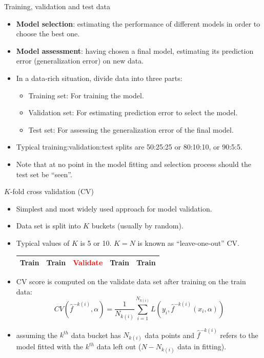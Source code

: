 \documentclass[aspectratio=169]{beamer}
\begin{document}
\begin{frame}{Training, validation and test data}
    \begin{itemize}
        \item \textbf{Model selection}: estimating the performance of different models in order to choose the best one.
        \item \textbf{Model assessment}: having chosen a final model, estimating its prediction error (generalization error) on new data.
        \item In a data-rich situation, divide data into three parts:
        \begin{itemize}
            \item Training set: For training the model.
            \item Validation set: For estimating prediction error to select the model.
            \item Test set: For assessing the generalization error of the final model.
        \end{itemize}
        \item Typical training:validation:test splits are 50:25:25 or 80:10:10, or 90:5:5.
        \item Note that at no point in the model fitting and selection process should the test set be ``seen''.
    \end{itemize}
\end{frame}


\begin{frame}{$K$-fold cross validation (CV)}
    \begin{itemize}
        \item Simplest and most widely used approach for model validation.
        \item Data set is split into $K$ buckets (usually by random).
        \item Typical values of $K$ is 5 or 10. $K = N$ is known as ``leave-one-out'' CV.
        \begin{table}
        \begin{tabular}{|p{1.7cm}|p{1.7cm}|p{1.7cm}|p{1.7cm}|p{1.7cm}|}
            \hline
            \Large{Train} & \Large{Train} & \textcolor{red}{\Large{Validate}} & \Large{Train} & \Large{Train}\\
            \hline
        \end{tabular}
        \end{table}
        \item CV score is computed on the validate data set after training on the train data:
        \begin{equation*}
                CV(\hat{f}^{-k(i)},\alpha) = \frac{1}{N_{k(i)}}\sum_{i=1}^{N_{k(i)}} L(y_i, \hat{f}^{-k(i)}(x_i,\alpha))
        \end{equation*}
        \item assuming the $k^{th}$ data bucket has $N_{k(i)}$ data points and $\hat{f}^{-k(i)}$ refers to the model fitted with the $k^{th}$ data left out ($N-N_{k(i)}$ data in fitting).
    \end{itemize}
\end{frame}
\end{document}
